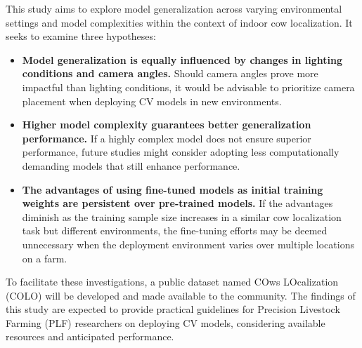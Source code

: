 This study aims to explore model generalization across varying environmental settings and model complexities within the context of indoor cow localization. It seeks to examine three hypotheses:

\begin{itemize}
    \item \textbf{Model generalization is equally influenced by changes in lighting conditions and camera angles.} Should camera angles prove more impactful than lighting conditions, it would be advisable to prioritize camera placement when deploying CV models in new environments.
    \item \textbf{Higher model complexity guarantees better generalization performance.} If a highly complex model does not ensure superior performance, future studies might consider adopting less computationally demanding models that still enhance performance.
    \item \textbf{The advantages of using fine-tuned models as initial training weights are persistent over pre-trained models.} If the advantages diminish as the training sample size increases in a similar cow localization task but different environments, the fine-tuning efforts may be deemed unnecessary when the deployment environment varies over multiple locations on a farm.
\end{itemize}

To facilitate these investigations, a public dataset named COws LOcalization (COLO) \cite{COLODataset2023} will be developed and made available to the community. The findings of this study are expected to provide practical guidelines for Precision Livestock Farming (PLF) researchers on deploying CV models, considering available resources and anticipated performance.